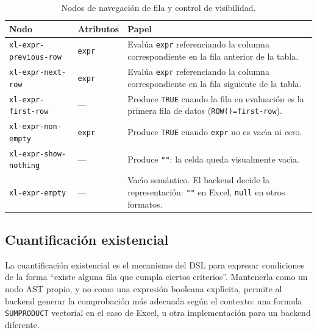 \documentclass[12pt,a4paper]{report}
\begin{document}
\begin{table}[h!]
\centering
\caption{Nodos de navegaci\'on de fila y control de visibilidad.}
\label{tab:ast-navegacion}
\renewcommand{\arraystretch}{1.3}
\begin{tabular}{p{3.8cm} p{3.8cm} p{6.2cm}}
\hline
\textbf{Nodo} & \textbf{Atributos} & \textbf{Papel} \\
\hline
\texttt{xl-expr-previous-row}
  & \texttt{expr}
  & Eval\'ua \texttt{expr} referenciando la columna correspondiente en la
    fila anterior de la tabla. \\
\hline
\texttt{xl-expr-next-row}
  & \texttt{expr}
  & Eval\'ua \texttt{expr} referenciando la columna correspondiente en la
    fila siguiente de la tabla. \\
\hline
\texttt{xl-expr-first-row}
  & ---
  & Produce \texttt{TRUE} cuando la fila en evaluaci\'on es la primera fila
    de datos (\texttt{ROW()=first-row}). \\
\hline
\texttt{xl-expr-non-empty}
  & \texttt{expr}
  & Produce \texttt{TRUE} cuando \texttt{expr} no es vac\'{\i}a ni cero. \\
\hline
\texttt{xl-expr-show-nothing}
   & ---
   & Produce \texttt{""}: la celda queda visualmente vac\'{\i}a. \\
\hline
\texttt{xl-expr-empty}
   & ---
   & Vac\'{\i}o sem\'antico.  El backend decide la representaci\'on:
     \texttt{""} en Excel, \texttt{null} en otros formatos. \\
\hline
\end{tabular}
\end{table}

\subsection{Cuantificaci\'on existencial}
\label{sec:ast-cuantificacion}

La cuantificaci\'on existencial es el mecanismo del DSL para expresar
condiciones de la forma ``existe alguna fila que cumpla ciertos criterios''.
Mantenerla como un nodo AST propio, y no como una expresi\'on booleana
expl\'{\i}cita, permite al backend generar la comprobaci\'on m\'as adecuada
seg\'un el contexto: una formula \texttt{SUMPRODUCT} vectorial en el caso de
Excel, u otra implementaci\'on para un backend diferente.
\end{document}
